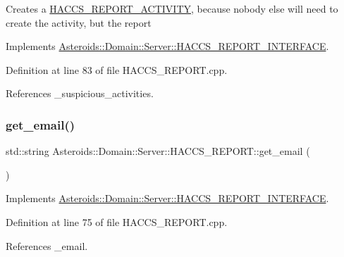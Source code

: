 Creates a \hyperlink{classAsteroids_1_1Domain_1_1Server_1_1HACCS__REPORT__ACTIVITY}{H\+A\+C\+C\+S\+\_\+\+R\+E\+P\+O\+R\+T\+\_\+\+A\+C\+T\+I\+V\+I\+TY}, because nobody else will need to create the activity, but the report 

Implements \hyperlink{classAsteroids_1_1Domain_1_1Server_1_1HACCS__REPORT__INTERFACE_aa9f992ed1f3748412fb9bd6521d8f3ff}{Asteroids\+::\+Domain\+::\+Server\+::\+H\+A\+C\+C\+S\+\_\+\+R\+E\+P\+O\+R\+T\+\_\+\+I\+N\+T\+E\+R\+F\+A\+CE}.



Definition at line 83 of file H\+A\+C\+C\+S\+\_\+\+R\+E\+P\+O\+R\+T.\+cpp.



References \+\_\+suspicious\+\_\+activities.

\mbox{\label{classAsteroids_1_1Domain_1_1Server_1_1HACCS__REPORT_a6782df87aa6252fa3a77ffed948d5dd7}} 
\subsubsection{\texorpdfstring{get\+\_\+email()}{get\_email()}}
{\footnotesize\ttfamily std\+::string Asteroids\+::\+Domain\+::\+Server\+::\+H\+A\+C\+C\+S\+\_\+\+R\+E\+P\+O\+R\+T\+::get\+\_\+email (\begin{DoxyParamCaption}{ }\end{DoxyParamCaption})\hspace{0.3cm}{\ttfamily [virtual]}}



Implements \hyperlink{classAsteroids_1_1Domain_1_1Server_1_1HACCS__REPORT__INTERFACE_a766b8de53dfc16a5598d64012ba2564c}{Asteroids\+::\+Domain\+::\+Server\+::\+H\+A\+C\+C\+S\+\_\+\+R\+E\+P\+O\+R\+T\+\_\+\+I\+N\+T\+E\+R\+F\+A\+CE}.



Definition at line 75 of file H\+A\+C\+C\+S\+\_\+\+R\+E\+P\+O\+R\+T.\+cpp.



References \+\_\+email.

\mbox{\label{classAsteroids_1_1Domain_1_1Server_1_1HACCS__REPORT_a8e8b4f73eed2ab97cbad9aaf6ba6f23d}} 
